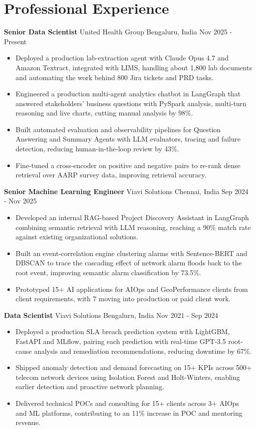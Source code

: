 \documentclass[10pt,a4paper]{article}
\newcommand{\role}[4]{\textbf{#1} \textbar{} #2 \hfill #3 \textbar{} #4\par}
\begin{document}
\section{Professional Experience}
\role{Senior Data Scientist}{United Health Group}{Bengaluru, India}{Nov 2025 - Present}
\begin{itemize}
  \item Deployed a production lab-extraction agent with Claude Opus 4.7 and Amazon Textract, integrated with LIMS, handling about 1,800 lab documents and automating the work behind 800 Jira tickets and PRD tasks.
  \item Engineered a production multi-agent analytics chatbot in LangGraph that answered stakeholders' business questions with PySpark analysis, multi-turn reasoning and live charts, cutting manual analysis by 98\%.
  \item Built automated evaluation and observability pipelines for Question Answering and Summary Agents with LLM evaluators, tracing and failure detection, reducing human-in-the-loop review by 43\%.
  \item Fine-tuned a cross-encoder on positive and negative pairs to re-rank dense retrieval over AARP survey data, improving retrieval accuracy.
\end{itemize}
\vspace{3pt}
\role{Senior Machine Learning Engineer}{Viavi Solutions}{Chennai, India}{Sep 2024 - Nov 2025}
\begin{itemize}
  \item Developed an internal RAG-based Project Discovery Assistant in LangGraph combining semantic retrieval with LLM reasoning, reaching a 90\% match rate against existing organizational solutions.
  \item Built an event-correlation engine clustering alarms with Sentence-BERT and DBSCAN to trace the cascading effect of network alarm floods back to the root event, improving semantic alarm classification by 73.5\%.
  \item Prototyped 15+ AI applications for AIOps and GeoPerformance clients from client requirements, with 7 moving into production or paid client work.
\end{itemize}
\vspace{3pt}
\role{Data Scientist}{Viavi Solutions}{Bengaluru, India}{Nov 2021 - Sep 2024}
\begin{itemize}
  \item Deployed a production SLA breach prediction system with LightGBM, FastAPI and MLflow, pairing each prediction with real-time GPT-3.5 root-cause analysis and remediation recommendations, reducing downtime by 67\%.
  \item Shipped anomaly detection and demand forecasting on 15+ KPIs across 500+ telecom network devices using Isolation Forest and Holt-Winters, enabling earlier detection and proactive network planning.
  \item Delivered technical POCs and consulting for 15+ clients across 3+ AIOps and ML platforms, contributing to an 11\% increase in POC and mentoring revenue.
\end{itemize}
\end{document}
